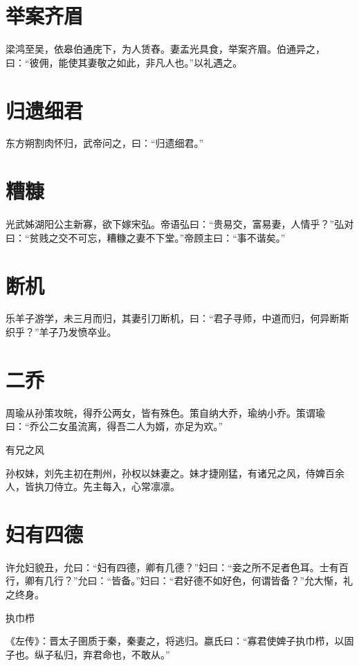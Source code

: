 \documentclass[a4paper,12pt,UTF8,twoside]{ctexbook}
\begin{document}
    \section{举案齐眉}
    
    梁鸿至吴，依皋伯通庑下，为人赁舂。妻孟光具食，举案齐眉。伯通异之，曰：“彼佣，能使其妻敬之如此，非凡人也。”以礼遇之。
    
    \section{归遗细君}
    
    东方朔割肉怀归，武帝问之，曰：“归遗细君。”
    
    \section{糟糠}
    
    光武姊湖阳公主新寡，欲下嫁宋弘。帝语弘曰：“贵易交，富易妻，人情乎？”弘对曰：“贫贱之交不可忘，糟糠之妻不下堂。”帝顾主曰：“事不谐矣。”
    
    \section{断机}
    
    乐羊子游学，未三月而归，其妻引刀断机，曰：“君子寻师，中道而归，何异断斯织乎？”羊子乃发愤卒业。
    
    \section{二乔}
    
    周瑜从孙策攻皖，得乔公两女，皆有殊色。策自纳大乔，瑜纳小乔。策谓瑜曰：“乔公二女虽流离，得吾二人为婿，亦足为欢。”
    
    有兄之风
    
    孙权妹，刘先主初在荆州，孙权以妹妻之。妹才捷刚猛，有诸兄之风，侍婢百余人，皆执刀侍立。先主每入，心常凛凛。
    
    \section{妇有四德}
    
    许允妇貌丑，允曰：“妇有四德，卿有几德？”妇曰：“妾之所不足者色耳。士有百行，卿有几行？”允曰：“皆备。”妇曰：“君好德不如好色，何谓皆备？”允大惭，礼之终身。
    
    执巾栉
    
    《左传》：晋太子圉质于秦，秦妻之，将逃归。嬴氏曰：“寡君使婢子执巾栉，以固子也。纵子私归，弃君命也，不敢从。”
    
\end{document}
